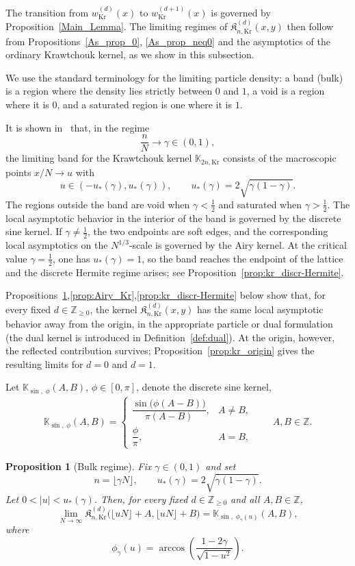 \documentclass[reqno,11pt]{amsart}
\newcommand{\ZZ}{\mathbb{Z}}
\theoremstyle{plain}
\newtheorem{prop}[thm]{Proposition}
\theoremstyle{definition}
\numberwithin{equation}{section}
\begin{document}
The transition from $w_{\mathrm{Kr}}^{(d)}(x)$ to
$w_{\mathrm{Kr}}^{(d+1)}(x)$ is governed by
Proposition~\ref{Main_Lemma}. The limiting regimes of
$\mathfrak K^{(d)}_{n,\mathrm{Kr}}(x,y)$ then follow from Propositions~\ref{As_prop_0}, \ref{As_prop_neq0} and the asymptotics of the ordinary Krawtchouk kernel,
as we show in this subsection.

We use the standard terminology for the limiting particle density: a band (bulk) is a region where the density lies strictly between $0$ and $1$, a void is a region where it is $0$, and a saturated region is one where it is $1$.

It is shown in~\cite{johansson2002non} that, in the
regime
\[
\frac nN\longrightarrow\gamma\in(0,1),
\]
the limiting band for the Krawtchouk kernel
\(\mathbb K_{2n,\mathrm{Kr}}\) consists of the macroscopic points
\(x/N\to u\) with
\[
u\in(-u_\ast(\gamma),u_\ast(\gamma)),
\qquad
u_\ast(\gamma)=2\sqrt{\gamma(1-\gamma)}.
\]
The regions outside the band are void when $\gamma<\frac12$ and saturated when $\gamma>\frac12$.
The local asymptotic behavior in the interior of the band is governed by the discrete sine kernel. If
\(\gamma\neq\frac12\), the two endpoints are soft edges, and the corresponding local asymptotics on the \(N^{1/3}\)-scale is governed by the Airy kernel. At the critical value \(\gamma=\frac12\), one has
\(u_\ast(\gamma)=1\), so the band reaches the endpoint of the lattice and the discrete Hermite regime arises; see Proposition~\ref{prop:kr_discr-Hermite}.

Propositions~\ref{prop:kr_bulk},\ref{prop:Airy_Kr},\ref{prop:kr_discr-Hermite} below show that, for every fixed $d\in\ZZ_{\ge0}$, the kernel $\mathfrak K^{(d)}_{n,\mathrm{Kr}}(x,y)$ has the same local asymptotic behavior away from the origin, in the appropriate particle or dual formulation (the dual kernel is introduced in Definition~\ref{def:dual}). At the origin, however, the reflected contribution survives; Proposition~\ref{prop:kr_origin} gives the resulting limits for $d=0$ and $d=1$.

Let $\mathbb K_{\sin,\; \phi}(A,B)$, $\phi\in [0,\pi]$,  denote the discrete sine kernel,
\begin{align*}
\mathbb K_{\sin,\; \phi}(A,B)= \begin{cases}
\dfrac{\sin\bigl(\phi(A-B)\bigr)}
      {\pi(A-B)},
& A\neq B,\\[2mm]
\dfrac{\phi}{\pi},
& A=B,
\end{cases}
\qquad A,B\in\ZZ.
\end{align*}
\begin{prop}[Bulk regime]\label{prop:kr_bulk}
Fix $\gamma\in(0,1)$ and set
\[
n=\lfloor\gamma N\rfloor,
\qquad
u_\ast(\gamma)=2\sqrt{\gamma(1-\gamma)}.
\]
Let $0<|u|<u_\ast(\gamma)$. Then, for every fixed \(d\in\ZZ_{\geq0}\) and all \(A,B\in\ZZ\),
\[
\lim_{N\to\infty}
\mathfrak K_{n,\mathrm{Kr}}^{(d)}
\bigl(\lfloor uN\rfloor+A,\lfloor uN\rfloor+B\bigr)
=
\mathbb K_{\sin,\;\phi_\gamma(u)}(A,B),
\]
where
\[
\phi_\gamma(u)
=
\arccos\left(
\frac{1-2\gamma}{\sqrt{1-u^2}}
\right).
\]
\end{prop}
\end{document}
